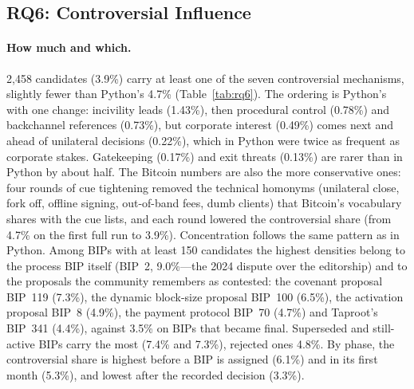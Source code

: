 \subsection{RQ6: Controversial Influence}
\label{sec:rq6}

\paragraph{How much and which.} 2,458 candidates (3.9\%) carry at least one of the seven controversial mechanisms, slightly fewer than Python's 4.7\% (Table~\ref{tab:rq6}). The ordering is Python's with one change: incivility leads (1.43\%), then procedural control (0.78\%) and backchannel references (0.73\%), but corporate interest (0.49\%) comes next and ahead of unilateral decisions (0.22\%), which in Python were twice as frequent as corporate stakes. Gatekeeping (0.17\%) and exit threats (0.13\%) are rarer than in Python by about half. The Bitcoin numbers are also the more conservative ones: four rounds of cue tightening removed the technical homonyms (unilateral close, fork off, offline signing, out-of-band fees, dumb clients) that Bitcoin's vocabulary shares with the cue lists, and each round lowered the controversial share (from 4.7\% on the first full run to 3.9\%). Concentration follows the same pattern as in Python. Among BIPs with at least 150 candidates the highest densities belong to the process BIP itself (BIP~2, 9.0\%---the 2024 dispute over the editorship) and to the proposals the community remembers as contested: the covenant proposal BIP~119 (7.3\%), the dynamic block-size proposal BIP~100 (6.5\%), the activation proposal BIP~8 (4.9\%), the payment protocol BIP~70 (4.7\%) and Taproot's BIP~341 (4.4\%), against 3.5\% on BIPs that became final. Superseded and still-active BIPs carry the most (7.4\% and 7.3\%), rejected ones 4.8\%. By phase, the controversial share is highest before a BIP is assigned (6.1\%) and in its first month (5.3\%), and lowest after the recorded decision (3.3\%).

